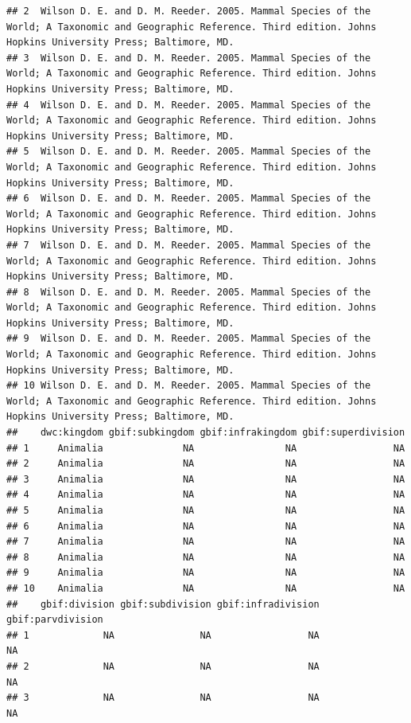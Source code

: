 \documentclass[]{book}
\begin{document}
\begin{verbatim}
## 2  Wilson D. E. and D. M. Reeder. 2005. Mammal Species of the World; A Taxonomic and Geographic Reference. Third edition. Johns Hopkins University Press; Baltimore, MD.
## 3  Wilson D. E. and D. M. Reeder. 2005. Mammal Species of the World; A Taxonomic and Geographic Reference. Third edition. Johns Hopkins University Press; Baltimore, MD.
## 4  Wilson D. E. and D. M. Reeder. 2005. Mammal Species of the World; A Taxonomic and Geographic Reference. Third edition. Johns Hopkins University Press; Baltimore, MD.
## 5  Wilson D. E. and D. M. Reeder. 2005. Mammal Species of the World; A Taxonomic and Geographic Reference. Third edition. Johns Hopkins University Press; Baltimore, MD.
## 6  Wilson D. E. and D. M. Reeder. 2005. Mammal Species of the World; A Taxonomic and Geographic Reference. Third edition. Johns Hopkins University Press; Baltimore, MD.
## 7  Wilson D. E. and D. M. Reeder. 2005. Mammal Species of the World; A Taxonomic and Geographic Reference. Third edition. Johns Hopkins University Press; Baltimore, MD.
## 8  Wilson D. E. and D. M. Reeder. 2005. Mammal Species of the World; A Taxonomic and Geographic Reference. Third edition. Johns Hopkins University Press; Baltimore, MD.
## 9  Wilson D. E. and D. M. Reeder. 2005. Mammal Species of the World; A Taxonomic and Geographic Reference. Third edition. Johns Hopkins University Press; Baltimore, MD.
## 10 Wilson D. E. and D. M. Reeder. 2005. Mammal Species of the World; A Taxonomic and Geographic Reference. Third edition. Johns Hopkins University Press; Baltimore, MD.
##    dwc:kingdom gbif:subkingdom gbif:infrakingdom gbif:superdivision
## 1     Animalia              NA                NA                 NA
## 2     Animalia              NA                NA                 NA
## 3     Animalia              NA                NA                 NA
## 4     Animalia              NA                NA                 NA
## 5     Animalia              NA                NA                 NA
## 6     Animalia              NA                NA                 NA
## 7     Animalia              NA                NA                 NA
## 8     Animalia              NA                NA                 NA
## 9     Animalia              NA                NA                 NA
## 10    Animalia              NA                NA                 NA
##    gbif:division gbif:subdivision gbif:infradivision gbif:parvdivision
## 1             NA               NA                 NA                NA
## 2             NA               NA                 NA                NA
## 3             NA               NA                 NA                NA

\end{verbatim}
\end{document}
